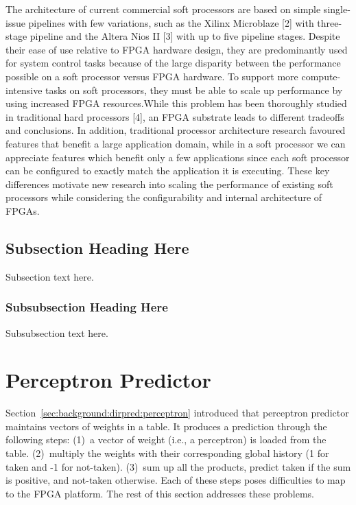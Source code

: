 \documentclass[conference]{IEEEtran}
\begin{document}
The architecture of current commercial soft processors are
based on simple single-issue pipelines with few variations, such
as the Xilinx Microblaze [2] with three-stage pipeline and the
Altera Nios II [3] with up to five pipeline stages. Despite their
ease of use relative to FPGA hardware design, they are predominantly
used for system control tasks because of the large
disparity between the performance possible on a soft processor
versus FPGA hardware. To support more compute-intensive
tasks on soft processors, they must be able to scale up performance
by using increased FPGA resources.While this problem
has been thoroughly studied in traditional hard processors [4],
an FPGA substrate leads to different tradeoffs and conclusions.
In addition, traditional processor architecture research favoured
features that benefit a large application domain, while in a
soft processor we can appreciate features which benefit only a
few applications since each soft processor can be configured
to exactly match the application it is executing. These key
differences motivate new research into scaling the performance
of existing soft processors while considering the configurability
and internal architecture of FPGAs.



\subsection{Subsection Heading Here}
Subsection text here.


\subsubsection{Subsubsection Heading Here}
Subsubsection text here.





\section{Perceptron Predictor}
\label{sec:advanced:perceptron}
Section~\ref{sec:background:dirpred:perceptron} introduced that perceptron predictor maintains vectors of weights in a table. It produces a prediction through the following steps: (1)~a vector of weight (i.e., a perceptron) is loaded from the table. (2)~multiply the weights with their corresponding global history (1 for taken and -1 for not-taken). (3)~sum up all the products, predict taken if the sum is positive, and not-taken otherwise. Each of these steps poses difficulties to map to the FPGA platform. The rest of this section addresses these problems.
\end{document}

